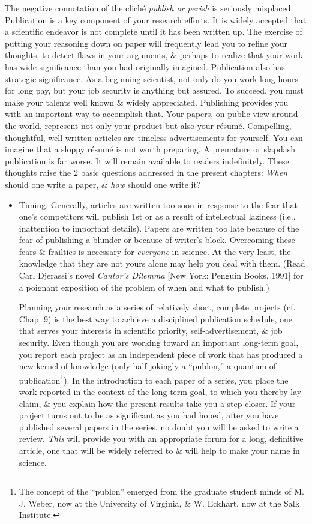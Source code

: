 \documentclass{article}
\begin{document}
\begin{enumerate}
\begin{itemize}
		The negative connotation of the clich\'e  \textit{publish or perish} is seriously misplaced. Publication is a key component of your research efforts. It is widely accepted that a scientific endeavor is not complete until it has been written up. The exercise of putting your reasoning down on paper will frequently lead you to refine your thoughts, to detect flaws in your arguments, \& perhaps to realize that your work has wide significance than you had originally imagined. Publication also has strategic significance. As a beginning scientist, not only do you work long hours for long pay, but your job security is anything but assured. To succeed, you must make your talents well known \& widely appreciated. Publishing provides you with an important way to accomplish that. Your papers, on public view around the world, represent not only your product but also your r\'esum\'e. Compelling, thoughtful, well-written articles are timeless advertisements for yourself. You can imagine that a sloppy r\'esum\'e is not worth preparing. A premature or slapdash publication is far worse. It will remain available to readers indefinitely. These thoughts raise the 2 basic questions addressed in the present chapters: \textit{When} should one write a paper, \& \textit{how} should one write it?
		\begin{itemize}
			\item {\sf Timing.} Generally, articles are written too soon in response to the fear that one's competitors will publish 1st or as a result of intellectual laziness (i.e., inattention to important details). Papers are written too late because of the fear of publishing a blunder or because of writer's block. Overcoming these fears \& frailties is necessary for \textit{everyone} in science. At the very least, the knowledge that they are not yours alone may help you deal with them. (Read Carl Djerassi's novel \textit{Cantor's Dilemma} [New York: Penguin Books, 1991] for a poignant exposition of the problem of when and what to publish.)
			
			Planning your research as a series of relatively short, complete projects (cf. Chap. 9) is the best way to achieve a disciplined publication schedule, one that serves your interests in scientific priority, self-advertisement, \& job security. Even though you are working toward an important long-term goal, you report each project as an independent piece of work that has produced a new kernel of knowledge (only half-jokingly a ``publon,'' a quantum of publication\footnote{The concept of the ``publon'' emerged from the graduate student minds of M. J. Weber, now at the University of Virginia, \& W. Eckhart, now at the Salk Institute.}). In the introduction to each paper of a series, you place the work reported in the context of the long-term goal, to which you thereby lay claim, \& you explain how the present results take you a step closer. If your project turns out to be as significant as you had hoped, after you have published several papers in the series, no doubt you will be asked to write a review. \textit{This} will provide you with an appropriate forum for a long, definitive article, one that will be widely referred to \& will help to make your name in science.
			

\end{itemize}
\end{itemize}
\end{enumerate}
\end{document}
